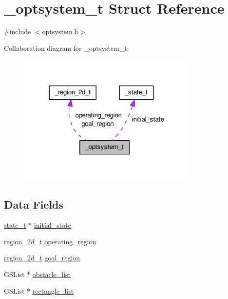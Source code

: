\hypertarget{a00004}{\section{\-\_\-optsystem\-\_\-t \-Struct \-Reference}
\label{d0/d0b/a00004}
}


{\ttfamily \#include $<$optsystem.\-h$>$}



\-Collaboration diagram for \-\_\-optsystem\-\_\-t\-:\nopagebreak
\begin{figure}[H]
\begin{center}
\leavevmode
\includegraphics[width=257pt]{de/d8c/a00036}
\end{center}
\end{figure}
\subsection*{\-Data \-Fields}
\begin{DoxyCompactItemize}
\item 
\hyperlink{a00018_a1c9d0bb39483d4981491e6383b0dbb47_a1c9d0bb39483d4981491e6383b0dbb47}{state\-\_\-t} $\ast$ \hyperlink{a00004_ad793fe48f6f4a6d697dc4629f9cb6e91_ad793fe48f6f4a6d697dc4629f9cb6e91}{initial\-\_\-state}
\item 
\hyperlink{a00018_a9136102e25aac8406a94d89f5a95bd1f_a9136102e25aac8406a94d89f5a95bd1f}{region\-\_\-2d\-\_\-t} \hyperlink{a00004_ade92b4bd2437c5d7a474613d0c0c8e95_ade92b4bd2437c5d7a474613d0c0c8e95}{operating\-\_\-region}
\item 
\hyperlink{a00018_a9136102e25aac8406a94d89f5a95bd1f_a9136102e25aac8406a94d89f5a95bd1f}{region\-\_\-2d\-\_\-t} \hyperlink{a00004_a78dce10731005cd5cac846e2eea1a76d_a78dce10731005cd5cac846e2eea1a76d}{goal\-\_\-region}
\item 
\-G\-S\-List $\ast$ \hyperlink{a00004_a5fa7d8df84a6fea47d81dec9cb2c68f2_a5fa7d8df84a6fea47d81dec9cb2c68f2}{obstacle\-\_\-list}
\item 
\-G\-S\-List $\ast$ \hyperlink{a00004_a74c86a6f406deb440600ab0679898043_a74c86a6f406deb440600ab0679898043}{rectangle\-\_\-list}
\end{DoxyCompactItemize}


